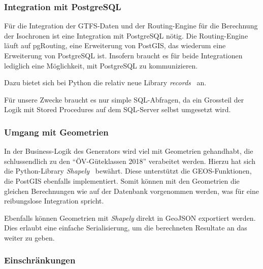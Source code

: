 \subsubsection{Integration mit PostgreSQL}
\label{analyse_generator:Integration mit PostgreSQL}

Für die Integration der GTFS-Daten und der Routing-Engine für die Berechnung der Isochronen ist eine Integration mit PostgreSQL nötig.
Die Routing-Engine läuft auf pgRouting, eine Erweiterung von PostGIS, das wiederum eine Erweiterung von PostgreSQL ist.
Insofern braucht es für beide Integrationen lediglich eine Möglichkeit, mit PostgreSQL zu kommunizieren.

Dazu bietet sich bei Python die relativ neue Library \emph{records}~\cite{records} an.

Für unsere Zwecke braucht es nur simple SQL-Abfragen, da ein Grossteil der Logik mit \glspl{Stored Procedure} auf dem SQL-Server selbst umgesetzt wird.

\subsubsection{Umgang mit Geometrien}
\label{analyse_generator: Umgang mit Geometrien}

In der Business-Logik des Generators wird viel mit Geometrien gehandhabt, die schlussendlich zu den "`ÖV-Güteklassen 2018"' verabeitet werden.
Hierzu hat sich die Python-Library \emph{Shapely}~\cite{shapely} bewährt.
Diese unterstützt die \gls{GEOS}-Funktionen, die PostGIS ebenfalls implementiert.
Somit können mit den Geometrien die gleichen Berechnungen wie auf der Datenbank vorgenommen werden, was für eine reibungslose Integration spricht.

Ebenfalls können Geometrien mit \emph{Shapely} direkt in \gls{GeoJSON} exportiert werden.
Dies erlaubt eine einfache Serialisierung, um die berechneten Resultate an das  weiter zu geben.


\subsubsection{Einschränkungen}
\label{Analyse:Einschränkungen}


